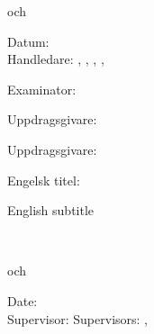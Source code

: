 {\begin{flushleft}
  \sffamily
  \ifinswedish
    \@prgmcode\par
    \ifx\@prgmcode och \@secondprgmcode \par  \fi   %
    \ifx\@date\@empty\relax\else Datum: \@date\\ \vspace{5mm} \fi
    Handledare: \@supervisorAsFirstname\space\@supervisorAsLastname
    \ifx\@supervisorBsLastname\@empty
    \else
    , \@supervisorBsFirstname\space\@supervisorBsLastname
    \fi %
    \ifx\@supervisorCsLastname\@empty
    \else
    , \@supervisorCsFirstname\space\@supervisorCsLastname
    \fi %
    \ifx\@supervisorDsLastname\@empty
    \else
    , \@supervisorDsFirstname\space\@supervisorDsLastname
    \fi
    \ifx\@supervisorEsLastname\@empty
    \else
    , \@supervisorEsFirstname\space\@supervisorEsLastname
    \fi
    \par
    Examinator: \@examinersFirstname\space\@examinersLastname\par
    \@examinersSchool\par
    \ifx\@hostcompany\@empty\relax\else Uppdragsgivare: \@hostcompany \par \fi
    \ifx\@hostorganization\@empty\relax\else Uppdragsgivare: \@hostorganization \par \fi
    \ifx\@alttitle\empty\relax\else Engelsk titel: %
    \begin{otherlanguage}{english}\sffamily\@alttitle\end{otherlanguage} \fi
    \ifx\@altsubtitle\@empty\relax
    \else
    English subtitle \begin{otherlanguage}{english}\sffamily\@altsubtitle\end{otherlanguage} \\
    \fi
  \else
    \@prgmcode\par
    \ifx\@prgmcode och \@secondprgmcode \par  \fi   %
    \ifx\@date\@empty\relax\else Date: \@date\\ \vspace{5mm} \fi
    \ifx\@supervisorBsLastname\@empty
    Supervisor: \@supervisorAsFirstname\space\@supervisorAsLastname
    \else
    Supervisors: \@supervisorAsFirstname\space\@supervisorAsLastname,  \@supervisorBsFirstname\space\@supervisorBsLastname

\end{flushleft}}
